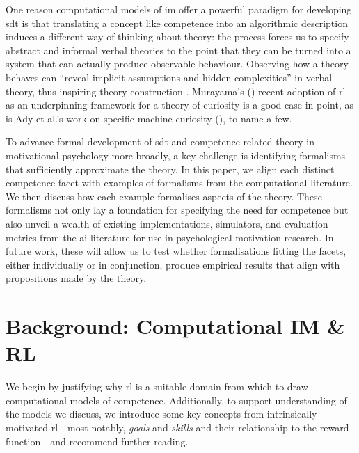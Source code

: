 \documentclass[10pt,letterpaper]{article}
\begin{document}
One reason computational models of \gls{im} offer a powerful paradigm for developing \gls{sdt} is that translating a concept like competence into an algorithmic description induces a different way of thinking about theory: the process forces us to specify abstract and informal verbal theories to the point that they can be turned into a system that can actually produce observable behaviour. Observing how a theory behaves can ``reveal implicit assumptions and hidden complexities'' in verbal theory, thus inspiring theory construction \citep[p.~4]{marsella2010computational}. Murayama's (\citeyear{murayama2022reward-learning}) recent adoption of \gls{rl} as an underpinning framework for a theory of curiosity is a good case in point, as is Ady et al.'s work on specific machine curiosity (\citeyear{ady2022five}), to name a few.

To advance formal development of \gls{sdt} and competence-related theory in motivational psychology more broadly, a key challenge is identifying formalisms that sufficiently approximate the theory. In this paper, we align each distinct competence facet with examples of formalisms from the computational literature. We then discuss how each example formalises aspects of the theory. These formalisms not only lay a foundation for specifying the need for competence but also unveil a wealth of existing implementations, simulators, and evaluation metrics from the \gls{ai} literature for use in psychological motivation research. In future work, these will allow us to test whether formalisations fitting the facets, either individually or in conjunction, produce empirical results that align with propositions made by the theory.


\section{Background: Computational IM \& RL}
\label{sec:imgcrl}

We begin by justifying why \gls{rl} is a suitable domain from which to draw computational models of competence. Additionally, to support understanding of the models we discuss, we introduce some key concepts from intrinsically motivated \gls{rl}---most notably, \emph{goals} and \emph{skills} and their relationship to the reward function---and recommend further reading.
\end{document}
